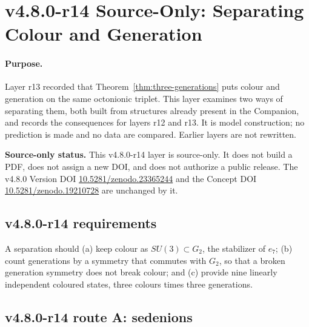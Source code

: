 
\clearpage
\section*{v4.8.0-r14 Source-Only: Separating Colour and Generation}
\label{sec:v480-r14-colour-generation}

\paragraph{Purpose.}
Layer r13 recorded that Theorem~\ref{thm:three-generations} puts colour and generation on the same octonionic
triplet.  This layer examines two ways of separating them, both built from structures already present in the
Companion, and records the consequences for layers r12 and r13.  It is model construction; no prediction is made
and no data are compared.  Earlier layers are not rewritten.

\noindent\textbf{Source-only status.}
This v4.8.0-r14 layer is source-only.  It does not build a PDF, does not assign a new DOI,
and does not authorize a public release.  The v4.8.0 Version DOI
\href{https://doi.org/10.5281/zenodo.23365244}{10.5281/zenodo.23365244} and the Concept DOI
\href{https://doi.org/10.5281/zenodo.19210728}{10.5281/zenodo.19210728} are unchanged by it.

\subsection*{v4.8.0-r14 requirements}
\label{subsec:v480-r14-requirements}

A separation should (a) keep colour as \(SU(3)\subset G_2\), the stabilizer of \(e_7\); (b) count generations by a
symmetry that commutes with \(G_2\), so that a broken generation symmetry does not break colour; and (c) provide
nine linearly independent coloured states, three colours times three generations.

\subsection*{v4.8.0-r14 route A: sedenions}
\label{subsec:v480-r14-sedenions}

